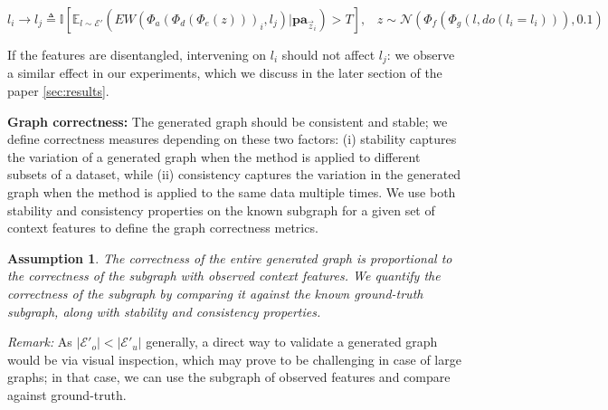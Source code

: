 \documentclass{article}
\newcommand{\ftcom}[2][]{\todo[author=FT, #1]{#2}}
\newtheorem{asu}{Assumption}
\begin{document}
\begin{equation}
    l_i \rightarrow l_j \triangleq \mathbb{I} [ \mathbb{E}_{l \sim \mathcal{E}'}(EW (\Phi_a(\Phi_d(\Phi_e(z)))_i, l_j ) | \textbf{pa}_{\vec{z}_i}) \!\!> \!\!T], %
    \; \; \; z \!\sim\! \mathcal{N}(\Phi_f (\Phi_g (l, do(l_i \!=\! l_i))), 0.1)
    \label{eqn:explicitedge}
\end{equation}

If the features are disentangled, intervening on $l_i$ should not affect $l_j$: we observe a similar effect in our experiments, which we discuss in the later section of the paper \ref{sec:results}.

\textbf{Graph correctness: }
The generated graph should be consistent and stable; we define correctness measures depending on these two factors: (i) stability captures the variation of a generated graph when the method is applied to different subsets of a dataset, while (ii) consistency captures the variation in the generated graph when the method is applied to the same data multiple times. 
We use both stability and consistency properties on the known subgraph for a given set of context features to define the graph correctness metrics.

\begin{asu}
\label{assumption:graph_correctness}
The correctness of the entire generated graph is proportional to the correctness of the subgraph with observed context features. We quantify the correctness of the subgraph by comparing it against the known ground-truth subgraph, along with stability and consistency properties.
\end{asu}

\textit{Remark:} As $|\mathcal{E}'_o| < |\mathcal{E}'_u|$ generally, a direct way to validate a generated graph would be via visual inspection, which may prove to be challenging in case of large graphs; in that case, we can use the subgraph of observed features and compare against ground-truth.
\end{document}
